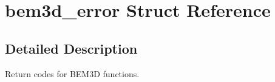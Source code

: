 \section{bem3d\_\-error Struct Reference}
\label{structbem3d__error}


\subsection{Detailed Description}
Return codes for BEM3D functions. 
